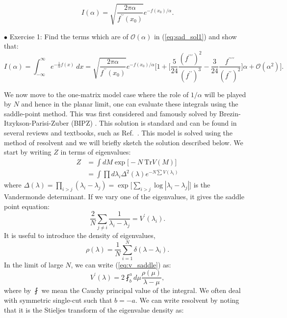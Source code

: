 \documentclass[letter,11pt]{article}
\begin{document}
\begin{equation}
	\label{eq:sad_sol1} 
	I(\alpha) =  \sqrt{\frac{2\pi \alpha}{f^{\prime\prime}(x_{0})}} e^{-f(x_{0})/\alpha}. 
\end{equation}



\begin{mdframed}[backgroundcolor=blue!3] 
	$\bullet$ Exercise 1: Find the terms which are of $\mathcal{O}(\alpha)$ in (\ref{eq:sad_sol1}) and show that:
	\begin{equation*}
	I(\alpha) = \int_{-\infty}^{\infty} e^{-\frac{1}{\alpha}f(x)} ~dx = \sqrt{\frac{2\pi \alpha}{f^{\prime\prime}(x_{0})}} e^{-f(x_{0})/\alpha} \Bigg[1 + 
	\Big[ \frac{5}{24} \frac{(f^{\prime\prime\prime})^2}{(f^{\prime\prime})^3} - \frac{3}{24} \frac{f^{\prime\prime\prime\prime}}{(f^{\prime\prime})^2}\Big] \alpha + \mathcal{O}(\alpha^{2})\Bigg]. 
	\end{equation*}	
\end{mdframed} 

We now move to the one-matrix model case where the role of $1/\alpha$ will be played by $N$ and hence in the planar limit, one can evaluate these integrals using the saddle-point method. This was first considered and famously solved by Brezin-Itzykson-Parisi-Zuber (BIPZ) \cite{Brezin:1977sv}. This solution is standard and can be found in several reviews and textbooks, such as Ref.~\cite{DiFrancesco:1993cyw, Marino:2004eq, 2002mcgt.book.....M}. This model is solved using the method of resolvent
and we will briefly sketch the solution described below. We start by writing $Z$ in terms of eigenvalues:
\begin{align}
	Z &= \int dM \exp\Big[-N~\mbox{Tr} V(M)\Big] \\
	& = \int \prod d\lambda_{i} \Delta^2(\lambda)  e^{-N \sum V(\lambda_i)} 
\end{align}
where $\Delta(\lambda) = \prod_{i > j} (\lambda_i - \lambda_j) = \exp\Big[\sum_{i>j} \log |\lambda_{i} - \lambda_{j}|\Big]$ is the Vandermonde 
determinant. If we vary one of the eigenvalues, it gives the saddle point equation:
\begin{equation}
	\label{eq:v_saddle}
	\frac{2}{N} \sum_{j \neq i} \frac{1}{\lambda_i - \lambda_j} = V^{\prime}(\lambda_i).
\end{equation}
It is useful to introduce the density of eigenvalues,
\begin{equation}
	\rho(\lambda) = \frac{1}{N} \sum_{i=1}^{N} \delta(\lambda - \lambda_i). 
\end{equation}
In the limit of large $N$, we can write (\ref{eq:v_saddle})
as:
\begin{equation}
	\label{eq:vprime}
	V^{\prime}(\lambda) = 2 \fint_{b}^{a} d\mu \frac{\rho(\mu)}{\lambda - \mu}, 
\end{equation}
where by $\fint$ we mean the Cauchy principal value of the integral. We 
often deal with symmetric single-cut such that $b=-a$. 
We can write resolvent by noting that it is the Stieljes transform of the eigenvalue density as: 
\end{document}
